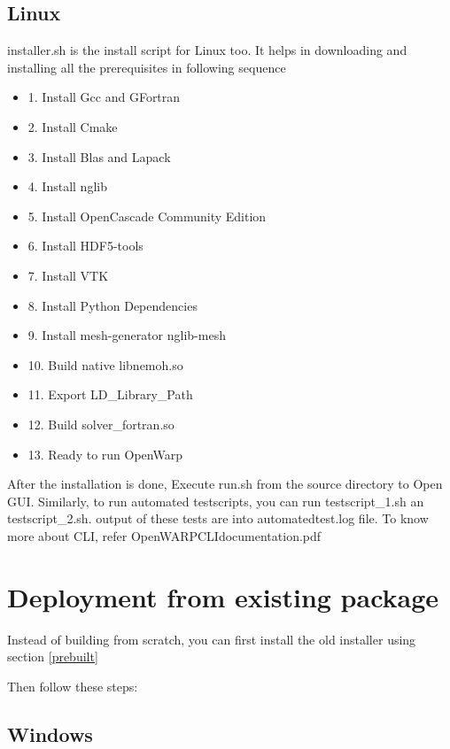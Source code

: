 \documentclass[12pt]{article}
\begin{document}
\subsection{Linux}
installer.sh is the install script for Linux too. It helps in downloading and installing all the prerequisites in following sequence
\begin{itemize}
\item 1. Install Gcc and GFortran
\item 2. Install Cmake
\item 3. Install Blas and Lapack
\item 4. Install nglib
\item 5. Install OpenCascade Community Edition
\item 6. Install HDF5-tools
\item 7. Install VTK 
\item 8. Install Python Dependencies 
\item 9. Install mesh-generator nglib-mesh
\item 10. Build native libnemoh.so
\item 11. Export LD_Library_Path
\item 12. Build solver_fortran.so
\item 13. Ready to run OpenWarp
\end{itemize}
After the installation is done, Execute run.sh from the source directory to Open GUI.
 Similarly, to run automated testscripts, you can run testscript_1.sh an testscript_2.sh. output of these tests are into automatedtest.log file. To know more about CLI, refer OpenWARPCLIdocumentation.pdf

\section{Deployment from existing package }

Instead of building from scratch, you can first install the old installer using section \ref{prebuilt}

Then follow these steps:

\subsection{Windows}
\end{document}
